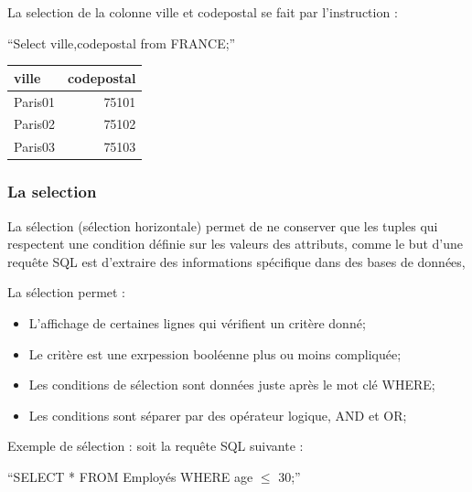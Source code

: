 \documentclass[oneside,13pt,a4paper]{report}
\begin{document}
La selection de la colonne ville et codepostal se fait par l'instruction :

\enquote{Select ville,codepostal from FRANCE;}

\begin{tabular}{|l|r|}
	\hline
	ville   & codepostal
	\\
	\hline
	Paris01 & 75101      \\
	Paris02 & 75102      \\
	Paris03 & 75103      \\
	\hline
\end{tabular}

\subsubsection{La selection}

La sélection (sélection horizontale) permet de ne conserver que les tuples qui respectent une condition définie sur les valeurs des attributs,
comme le but d'une requête SQL est d'extraire des informations spécifique dans des bases de données,

La sélection permet :
\begin{itemize}
	\item L'affichage de certaines lignes qui vérifient un critère donné;
	\item Le critère est une exrpession booléenne plus ou moins compliquée;
	\item Les conditions de sélection sont données juste après le mot clé WHERE;
	\item Les conditions sont séparer par des opérateur logique, AND et OR;
\end{itemize}
\pagebreak

Exemple de sélection :
soit la requête SQL suivante :

\begin{center}
	\enquote{SELECT * FROM Employés WHERE age $\leq$ 30;}
\end{center}
\end{document}
